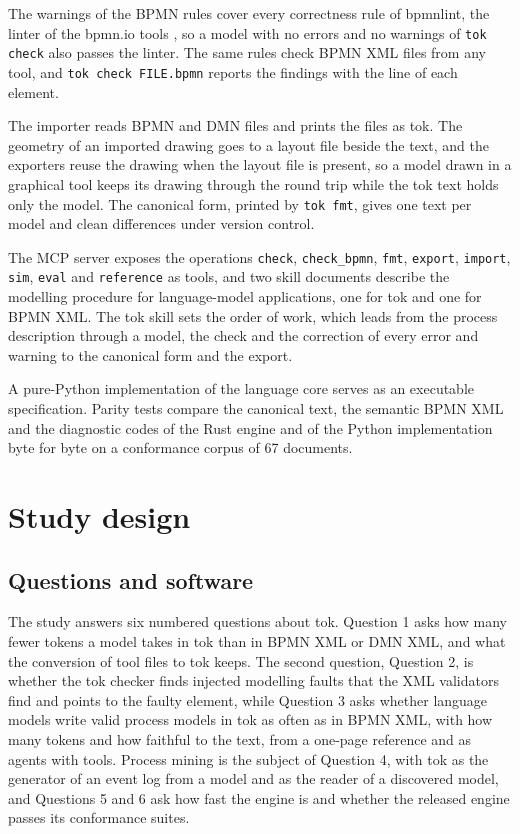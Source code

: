 \documentclass[11pt,a4paper]{article}
\begin{document}
The warnings of the BPMN rules cover every correctness rule of bpmnlint, the linter of the bpmn.io tools \citep{bpmnlint}, so a model with no errors and no warnings of \texttt{tok check} also passes the linter. The same rules check BPMN XML files from any tool, and \texttt{tok check FILE.bpmn} reports the findings with the line of each element.

The importer reads BPMN and DMN files and prints the files as tok. The geometry of an imported drawing goes to a layout file beside the text, and the exporters reuse the drawing when the layout file is present, so a model drawn in a graphical tool keeps its drawing through the round trip while the tok text holds only the model. The canonical form, printed by \texttt{tok fmt}, gives one text per model and clean differences under version control.

The MCP server \citep{MCP2025} exposes the operations \texttt{check}, \texttt{check\_bpmn}, \texttt{fmt}, \texttt{export}, \texttt{import}, \texttt{sim}, \texttt{eval} and \texttt{reference} as tools, and two skill documents describe the modelling procedure for language-model applications, one for tok and one for BPMN XML. The tok skill sets the order of work, which leads from the process description through a model, the check and the correction of every error and warning to the canonical form and the export.

A pure-Python implementation of the language core serves as an executable specification. Parity tests compare the canonical text, the semantic BPMN XML and the diagnostic codes of the Rust engine and of the Python implementation byte for byte on a conformance corpus of 67 documents.

\section{Study design}\label{sec:design}

\subsection{Questions and software}

The study answers six numbered questions about tok. Question 1 asks how many fewer tokens a model takes in tok than in BPMN XML or DMN XML, and what the conversion of tool files to tok keeps. The second question, Question 2, is whether the tok checker finds injected modelling faults that the XML validators find and points to the faulty element, while Question 3 asks whether language models write valid process models in tok as often as in BPMN XML, with how many tokens and how faithful to the text, from a one-page reference and as agents with tools. Process mining is the subject of Question 4, with tok as the generator of an event log from a model and as the reader of a discovered model, and Questions 5 and 6 ask how fast the engine is and whether the released engine passes its conformance suites.
\end{document}
